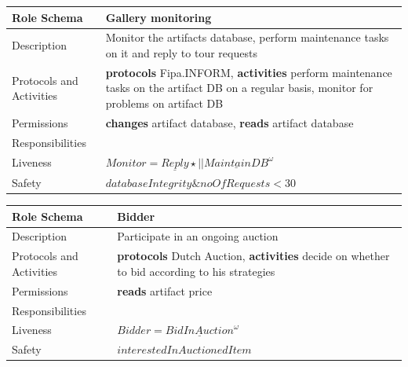 \documentclass[a4paper, 11pt]{article}
\begin{document}
\begin{table}[H]
	\label{my-label}
	\begin{tabular}{l p{7cm}}
		\hline
		Role Schema              & Gallery monitoring \\
		\hline
		Description              & Monitor the artifacts database, perform maintenance tasks on it and reply to tour requests \\
		Protocols and Activities & \textbf{protocols} Fipa.INFORM, \textbf{activities} perform maintenance tasks on the artifact DB on a regular basis, monitor for problems on artifact DB \\
		Permissions              & \textbf{changes} artifact database, \textbf{reads} artifact database \\
		\hline
		Responsibilities         &                   \\
		Liveness                 & \(Monitor=\underline{Reply}\star||\underline{MaintainDB}^\omega \) \\
		Safety                   & \(databaseIntegrity \& noOfRequests < 30 \) \\
		\hline
	\end{tabular}
\end{table}

\begin{table}[H]
	\label{my-label}
	\begin{tabular}{l p{7cm}}
		\hline
		Role Schema              & Bidder \\
		\hline
		Description              & Participate in an ongoing auction \\
		Protocols and Activities & \textbf{protocols} Dutch Auction, \textbf{activities} decide on whether to bid according to his strategies \\
		Permissions              & \textbf{reads} artifact price \\
		\hline
		Responsibilities         &                   \\
		Liveness                 & \(Bidder=\underline{BidInAuction}^\omega \) \\
		Safety                   & \(interestedInAuctionedItem \) \\
		\hline
	\end{tabular}
\end{table}
\end{document}
